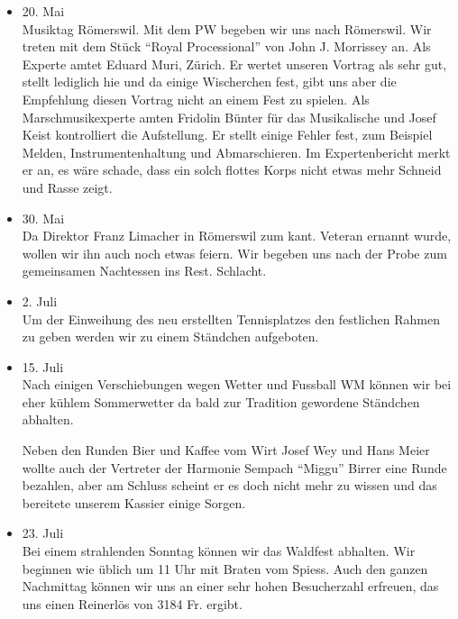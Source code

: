 \begin{multicols}{2}
\begin{itemize}
        \item[]20. Mai\\
        Musiktag Römerswil. Mit dem PW begeben wir uns nach Römerswil. Wir
        treten mit dem Stück \enquote{Royal Processional} von John J. Morrissey an.
        Als Experte amtet Eduard Muri, Zürich. Er wertet unseren Vortrag als
        sehr gut, stellt lediglich hie und da einige Wischerchen fest, gibt uns
        aber die Empfehlung diesen Vortrag nicht an einem Fest zu spielen. Als
        Marschmusikexperte amten Fridolin Bünter für das Musikalische und Josef
        Keist kontrolliert die Aufstellung. Er stellt einige Fehler fest, zum
        Beispiel Melden, Instrumentenhaltung und Abmarschieren. Im
        Expertenbericht merkt er an, es wäre schade, dass ein solch flottes
        Korps nicht etwas mehr Schneid und Rasse zeigt.

        \item[]30. Mai\\
        Da Direktor Franz Limacher in Römerswil zum kant. Veteran ernannt wurde,
        wollen wir ihn auch noch etwas feiern. Wir begeben uns nach der Probe
        zum gemeinsamen Nachtessen ins Rest. Schlacht.

        \item[]2. Juli\\
        Um der Einweihung des neu erstellten Tennisplatzes den festlichen Rahmen
        zu geben werden wir zu einem Ständchen aufgeboten.

        \item[]15. Juli\\
        Nach einigen Verschiebungen wegen Wetter und Fussball WM können wir bei
        eher kühlem Sommerwetter da bald zur Tradition gewordene Ständchen
        abhalten.

        Neben den Runden Bier und Kaffee vom Wirt Josef Wey und Hans Meier
        wollte auch der Vertreter der Harmonie Sempach \enquote{Miggu} Birrer eine
        Runde bezahlen, aber am Schluss scheint er es doch nicht mehr zu wissen
        und das bereitete unserem Kassier einige Sorgen.

        \item[]23. Juli\\
        Bei einem strahlenden Sonntag können wir das Waldfest abhalten. Wir
        beginnen wie üblich um 11 Uhr mit Braten vom Spiess. Auch den ganzen
        Nachmittag können wir uns an einer sehr hohen Besucherzahl erfreuen, das
        uns einen Reinerlös von 3184 Fr. ergibt.


\end{itemize}
\end{multicols}
